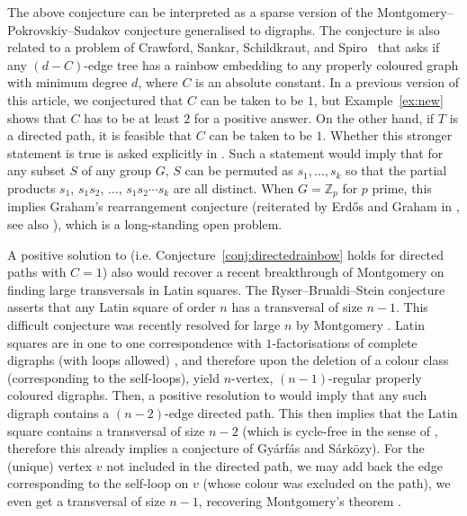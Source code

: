 \documentclass[a4paper,11pt,hidelinks]{amsart}
\theoremstyle{definition}
\begin{document}
The above conjecture can be interpreted as a sparse version of the Montgomery--Pokrovskiy--Sudakov conjecture \cite[Conjecture 11.1]{approximateringel} generalised to digraphs. The conjecture is also related to a problem of Crawford, Sankar, Schildkraut, and Spiro~\cite{crawford2025rainbow} that asks if any $(d-C)$-edge tree has a rainbow embedding to any properly coloured graph with minimum degree $d$, where $C$ is an absolute constant. In a previous version of this article, we conjectured that $C$ can be taken to be $1$, but Example~\ref{ex:new} shows that $C$ has to be at least $2$ for a positive answer. On the other hand, if $T$ is a directed path, it is feasible that $C$ can be taken to be $1$. Whether this stronger statement is true is asked explicitly in \cite[Problem 1.6]{bucic2025towards}. Such a statement would imply that for any subset $S$ of any group $G$, $S$ can be permuted as $s_1,\ldots, s_k$ so that the partial products $s_1$, $s_1s_2$, $\ldots$, $s_1s_2\cdots s_k$ are all distinct. When $G=\mathbb{Z}_p$ for $p$ prime, this implies Graham's rearrangement conjecture \cite{graham1971sums} (reiterated by Erd\H{o}s and Graham in \cite{ErdosGraham}, see also \cite{bucic2025towards, BedertBucicKravitzMontgomeryMuyesser2025, BederdKravitz}), which is a long-standing open problem.
\par A positive solution to \cite[Problem 1.6]{bucic2025towards} (i.e. Conjecture~\ref{conj:directedrainbow} holds for directed paths with $C=1$) also would recover a recent breakthrough of Montgomery on finding large transversals in Latin squares.  The Ryser--Brualdi--Stein \cite{ryser1967neuere, brualdi1991combinatorial, stein1975transversals} conjecture asserts that any Latin square of order $n$ has a transversal of size $n-1$. This difficult conjecture was recently resolved for large $n$ by Montgomery \cite{Montgomery2024}. Latin squares are in one to one correspondence with $1$-factorisations of complete digraphs (with loops allowed) \cite{Pokrovskiy2022_RainbowSubgraphs}, and therefore upon the deletion of a colour class (corresponding to the self-loops), yield $n$-vertex, $(n-1)$-regular properly coloured digraphs. Then, a positive resolution to \cite[Problem 1.6]{bucic2025towards} would imply that any such digraph contains a $(n-2)$-edge directed path. This then implies that the Latin square contains a transversal of size $n-2$ (which is cycle-free in the sense of \cite{gyarfas2014rainbow}, therefore this already implies a conjecture of Gy{\'a}rf{\'a}s and S{\'a}rk{\"o}zy). For the (unique) vertex $v$ not included in the directed path, we may add back the edge corresponding to the self-loop on $v$ (whose colour was excluded on the path), we even get a transversal of size $n-1$, recovering Montgomery's theorem \cite{Montgomery2024}.
\end{document}
